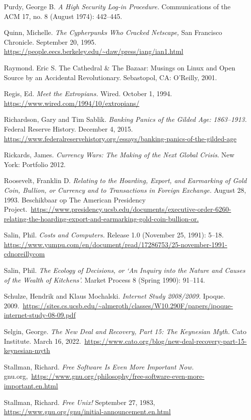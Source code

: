 \documentclass[
  a5paper,
  smalldemyvopaper,11pt,twoside,onecolumn,openright,extrafontsizes,
hidelinks]{memoir}
\begin{document}
Purdy, George B. \emph{A High Security Log-in Procedure.} Communications
of the ACM 17, no. 8 (August 1974): 442--445.

Quinn, Michelle. \emph{The Cypherpunks Who Cracked Netscape,} San
Francisco Chronicle. September 20, 1995.
\url{https://people.eecs.berkeley.edu/~daw/press/iang/ian1.html}

Raymond. Eric S. The Cathedral \& The Bazaar: Musings on Linux and Open
Source by an Accidental Revolutionary. Sebastopol, CA: O'Reilly, 2001.

Regis, Ed. \emph{Meet the Extropians.} Wired. October 1, 1994.
\url{https://www.wired.com/1994/10/extropians/}

Richardson, Gary and Tim Sablik. \emph{Banking Panics of the Gilded Age:
1863--1913.} Federal Reserve History. December 4, 2015.
\url{https://www.federalreservehistory.org/essays/banking-panics-of-the-gilded-age}

Rickards, James. \emph{Currency Wars: The Making of the Next Global
Crisis}. New York: Portfolio 2012.

Roosevelt, Franklin D. \emph{Relating to the Hoarding, Export, and
Earmarking of Gold Coin, Bullion, or Currency and to Transactions in
Foreign Exchange.} August 28, 1993. Beschikbaar op The American
Presidency
Project.~\url{https://www.presidency.ucsb.edu/documents/executive-order-6260-relating-the-hoarding-export-and-earmarking-gold-coin-bullion-or.}

Salin, Phil. \emph{Costs and Computers.} Release 1.0 (November 25,
1991): 5--18.
\url{https://www.yumpu.com/en/document/read/17286753/25-november-1991-cdnoreillycom}

Salin, Phil. \emph{The Ecology of Decisions, or `An Inquiry into the
Nature and Causes of the Wealth of Kitchens'.} Market Process 8 (Spring
1990): 91--114.

Schulze, Hendrik and Klaus Mochalski. \emph{Internet Study 2008/2009.}
Ipoque.
2009.~\url{https://sites.cs.ucsb.edu/~almeroth/classes/W10.290F/papers/ipoque-internet-study-08-09.pdf}

Selgin, George. \emph{The New Deal and Recovery, Part 15: The Keynesian
Myth.} Cato Institute. March 16,
2022.~\url{https://www.cato.org/blog/new-deal-recovery-part-15-keynesian-myth}

Stallman, Richard. \emph{Free Software Is Even More Important Now.}
gnu.org,~\url{https://www.gnu.org/philosophy/free-software-even-more-important.en.html}

Stallman, Richard. \emph{Free Unix!} September 27, 1983,
\url{https://www.gnu.org/gnu/initial-announcement.en.html}
\end{document}
